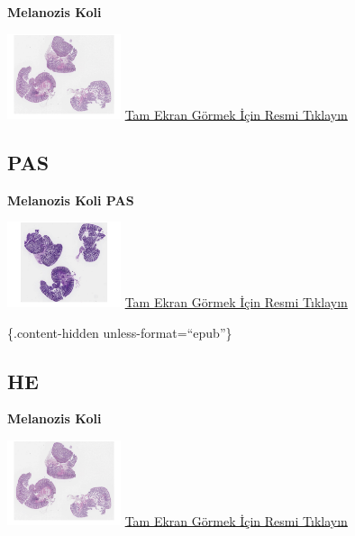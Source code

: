 \documentclass[
  letterpaper,
  DIV=11,
  numbers=noendperiod]{scrreprt}
\begin{document}
\textbf{Melanozis Koli}

\href{https://images.patolojiatlasi.com/melanosiscoli/HE.html}{\includegraphics[width=0.25\textwidth,height=\textheight]{./screenshots/melanosiscoli-HE_screenshot.png}}
\href{https://images.patolojiatlasi.com/melanosiscoli/HE.html}{Tam Ekran
Görmek İçin Resmi Tıklayın}

\hypertarget{pas-1}{%
\subsection{PAS}\label{pas-1}}

\textbf{Melanozis Koli PAS}

\href{https://images.patolojiatlasi.com/melanosiscoli/PAS.html}{\includegraphics[width=0.25\textwidth,height=\textheight]{./screenshots/melanosiscoli-PAS_screenshot.png}}
\href{https://images.patolojiatlasi.com/melanosiscoli/PAS.html}{Tam
Ekran Görmek İçin Resmi Tıklayın}

\{.content-hidden unless-format=``epub''\}

\hypertarget{he-2}{%
\subsection{HE}\label{he-2}}

\textbf{Melanozis Koli}

\href{https://images.patolojiatlasi.com/melanosiscoli/HE.html}{\includegraphics[width=0.25\textwidth,height=\textheight]{./screenshots/melanosiscoli-HE_screenshot.png}}
\href{https://images.patolojiatlasi.com/melanosiscoli/HE.html}{Tam Ekran
Görmek İçin Resmi Tıklayın}
\end{document}
